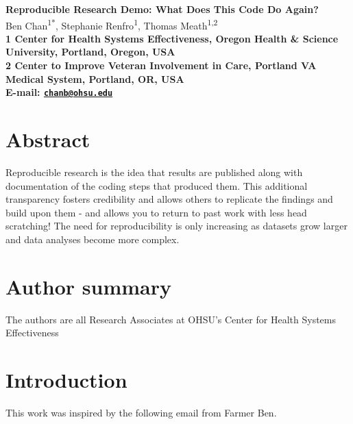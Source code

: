 \documentclass[10pt]{article}
\date{}
\begin{document}
\begin{flushleft}
{\Large
\textbf{Reproducible Research Demo: What Does This Code Do Again?}
}
\\
  Ben Chan\textsuperscript{1*},
  Stephanie Renfro\textsuperscript{1},
  Thomas Meath\textsuperscript{1,2}\\
\bf{1} Center for Health Systems Effectiveness, Oregon Health \& Science University,  Portland,  Oregon,  USA
\\
\bf{2} Center to Improve Veteran Involvement in Care, Portland VA Medical System,  Portland,  OR,  USA
\\

\textasteriskcentered{} E-mail:   \href{mailto:chanb@ohsu.edu}{\nolinkurl{chanb@ohsu.edu}}
  
  

\end{flushleft}

\section*{Abstract}\label{abstract}

Reproducible research is the idea that results are published along with
documentation of the coding steps that produced them. This additional
transparency fosters credibility and allows others to replicate the
findings and build upon them - and allows you to return to past work
with less head scratching! The need for reproducibility is only
increasing as datasets grow larger and data analyses become more
complex.

\section*{Author summary}\label{author-summary}

The authors are all Research Associates at OHSU's Center for Health
Systems Effectiveness

\section*{Introduction}\label{introduction}

This work was inspired by the following email from Farmer Ben.
\end{document}
